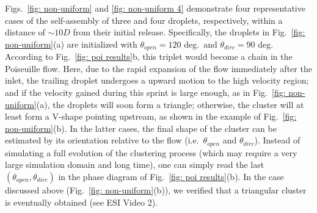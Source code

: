 Figs.\ \ref{fig: non-uniform} and \ref{fig: non-uniform 4} demonstrate four representative cases of the self-assembly of three and four droplets, respectively, within a distance of $\sim 10D$ from their initial release. Specifically, the droplets in Fig.\ \ref{fig: non-uniform}(a) are initialized with $\theta_{open}=120$ deg.\ and $\theta_{dirc}=90$ deg. According to Fig.\ \ref{fig: poi results}b, this triplet would become a chain in the Poiseuille flow. Here, due to the rapid expansion of the flow immediately after the inlet, the trailing droplet undergoes a upward motion to the high velocity region; and if the velocity gained during this sprint is large enough, as in Fig.\ \ref{fig: non-uniform}(a), the droplets will soon form a triangle; otherwise, the cluster will at least form a V-shape pointing upstream, as shown in the example of Fig.\ \ref{fig: non-uniform}(b). In the latter cases, the final shape of the cluster can be estimated by its orientation relative to the flow (i.e.\ $\theta_{open}$ and $\theta_{dirc}$). Instead of simulating a full evolution of the clustering process (which may require a very large simulation domain and long time), one can simply read the last $(\theta_{open},\theta_{dirc})$ in the phase diagram of Fig.\ \ref{fig: poi results}(b). In the case discussed above (Fig.\ \ref{fig: non-uniform}(b)), we verified that a triangular cluster is eventually obtained (see ESI Video 2).

